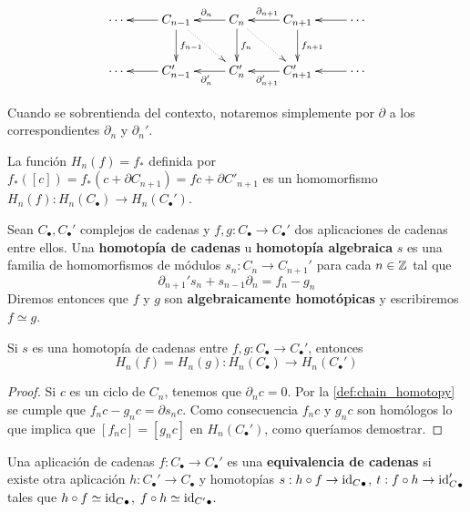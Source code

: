 \begin{equation}
	\label{chaincomplex}
	\xymatrix{
		\cdots & C_{n-1} \ar[l] \ar[d]^{f_{n-1}} \ar@{..>}[dr] & C_n \ar[l]_{\partial_{n}} \ar[d]^{f_n} \ar@{..>}[dr] & C_{n+1} \ar[l]_{\partial_{n+1}} \ar[d]^{f_{n+1}} & \cdots \ar[l] \\
		\cdots & C'_{n-1} \ar[l] & C'_n \ar[l]^{\partial'_{n}} & C'_{n+1} \ar[l]^{\partial'_{n+1}} & \cdots \ar[l]
    }
\end{equation}

Cuando se sobrentienda del contexto, notaremos simplemente por $\partial$ a los correspondientes $\partial_n$ y $\partial_n'$.

La función $H_n(f) = f_*$ definida por $f_*([c]) = f_*(c + \partial C_{n+1}) = fc + \partial C'_{n+1}$ es un homomorfismo $H_n(f): H_n(C_{\bullet}) \rightarrow H_n(C_{\bullet}')$.%

\begin{definicion}
	\label{def:chain_homotopy}
	Sean $C_{\bullet},C_{\bullet}'$ complejos de cadenas y $f,g: C_{\bullet} \rightarrow C_{\bullet}'$ dos aplicaciones de cadenas entre ellos. Una \textbf{homotopía de cadenas} u \textbf{homotopía algebraica} $s$ es una familia de homomorfismos de módulos $s_n: C_n \rightarrow C_{n+1}'$ para cada $n \in \mathbb{Z}$ tal que
	\begin{equation}
		\partial_{n+1}'s_n + s_{n-1} \partial_n = f_n - g_n
	\end{equation}
	Diremos entonces que $f$ y $g$ son \textbf{algebraicamente homotópicas} y escribiremos $f \simeq g$.
\end{definicion}

\begin{teorema}
	\label{teo:homot-cad-misma-homologia}
	Si $s$ es una homotopía de cadenas entre $f,g: C_{\bullet} \rightarrow C_{\bullet}'$, entonces
	\[ H_n(f) = H_n(g) : H_n(C_{\bullet}) \rightarrow H_n(C_{\bullet}') \]
\end{teorema}
\begin{proof}
	Si $c$ es un ciclo de $C_n$, tenemos que $\partial_n c = 0$. Por la \autoref{def:chain_homotopy} se cumple que $f_nc-g_nc =  \partial s_n c$. Como consecuencia $f_n c$ y $g_n c$ son homólogos lo que implica que $[f_n c] = [g_n c]$ en $H_n(C_{\bullet}')$, como queríamos demostrar.
\end{proof}

\begin{definicion}
	Una aplicación de cadenas $f: C_{\bullet} \rightarrow C_{\bullet}'$ es una \textbf{equivalencia de cadenas} si existe otra aplicación $h: C_{\bullet}' \rightarrow C_{\bullet}$ y homotopías $s: h \circ f \rightarrow {\operatorname{id}_C}_{\bullet}$, $t: f \circ h \rightarrow {\operatorname{id}_C'}_{\bullet}$ tales que $h \circ f \simeq {\operatorname{id}_C}_{\bullet}$, $f \circ h \simeq {\operatorname{id}_{C'}}_{\bullet}$.
\end{definicion}

